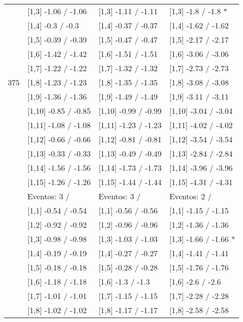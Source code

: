 \begin{table}
\begin{tabular}[t]{llll}
 & {}[1,3] -1.06  / -1.06 & {}[1,3] -1.11  / -1.11 & {}[1,3] -1.8  / -1.8 *\\
\addlinespace
 & {}[1,4] -0.3  / -0.3 & {}[1,4] -0.37  / -0.37 & {}[1,4] -1.62  / -1.62\\
 & {}[1,5] -0.39  / -0.39 & {}[1,5] -0.47  / -0.47 & {}[1,5] -2.17  / -2.17\\
 & {}[1,6] -1.42  / -1.42 & {}[1,6] -1.51  / -1.51 & {}[1,6] -3.06  / -3.06\\
 & {}[1,7] -1.22  / -1.22 & {}[1,7] -1.32  / -1.32 & {}[1,7] -2.73  / -2.73\\
375 & {}[1,8] -1.23  / -1.23 & {}[1,8] -1.35  / -1.35 & {}[1,8] -3.08  / -3.08\\
\addlinespace
 & {}[1,9] -1.36  / -1.36 & {}[1,9] -1.49  / -1.49 & {}[1,9] -3.11  / -3.11\\
 & {}[1,10] -0.85  / -0.85 & {}[1,10] -0.99  / -0.99 & {}[1,10] -3.04  / -3.04\\
 & {}[1,11] -1.08  / -1.08 & {}[1,11] -1.23  / -1.23 & {}[1,11] -4.02  / -4.02\\
 & {}[1,12] -0.66  / -0.66 & {}[1,12] -0.81  / -0.81 & {}[1,12] -3.54  / -3.54\\
 & {}[1,13] -0.33  / -0.33 & {}[1,13] -0.49  / -0.49 & {}[1,13] -2.84  / -2.84\\
\addlinespace
 & {}[1,14] -1.56  / -1.56 & {}[1,14] -1.73  / -1.73 & {}[1,14] -3.96  / -3.96\\
 & {}[1,15] -1.26  / -1.26 & {}[1,15] -1.44  / -1.44 & {}[1,15] -4.31  / -4.31\\
 & Eventos:  3 / & Eventos:  3 / & Eventos:  2 /\\
 & {}[1,1] -0.54  / -0.54 & {}[1,1] -0.56  / -0.56 & {}[1,1] -1.15  / -1.15\\
 & {}[1,2] -0.92  / -0.92 & {}[1,2] -0.96  / -0.96 & {}[1,2] -1.36  / -1.36\\
\addlinespace
 & {}[1,3] -0.98  / -0.98 & {}[1,3] -1.03  / -1.03 & {}[1,3] -1.66  / -1.66 *\\
 & {}[1,4] -0.19  / -0.19 & {}[1,4] -0.27  / -0.27 & {}[1,4] -1.41  / -1.41\\
 & {}[1,5] -0.18  / -0.18 & {}[1,5] -0.28  / -0.28 & {}[1,5] -1.76  / -1.76\\
 & {}[1,6] -1.18  / -1.18 & {}[1,6] -1.3  / -1.3 & {}[1,6] -2.6  / -2.6\\
 & {}[1,7] -1.01  / -1.01 & {}[1,7] -1.15  / -1.15 & {}[1,7] -2.28  / -2.28\\
\addlinespace
500 & {}[1,8] -1.02  / -1.02 & {}[1,8] -1.17  / -1.17 & {}[1,8] -2.58  / -2.58\\

\end{tabular}
\end{table}
